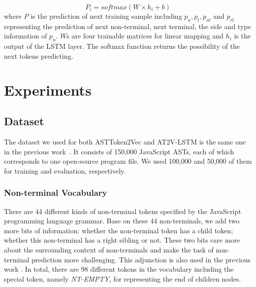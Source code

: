 \documentclass[E]{compsoft}
\begin{document}
\begin{equation}
P_{i} = \mathit{softmax}(W \times h_{i} + b)
\end{equation}
where $P$ is the prediction of next training sample including $p_{n}, p_{t}, p_{nl}$ and $p_{rl}$ representing the prediction of next non-terminal, next terminal, the side and type information of $p_{n}$. 
$W$s are four trainable matrices for linear mapping and $h_{i}$ is the output of the LSTM layer.
The softmax function returns the possibility of the next tokens predicting.
 




\section{Experiments}
\label{section:experiment}
\subsection{Dataset}
The dataset we used for both ASTToken2Vec and AT2V-LSTM  is the same one in the previous work~\cite{dataset}.  It consists of 150,000 JavaScript ASTs, each of which corresponds to one open-source program file.   We used 100,000 and 50,000 of them for training and evaluation, respectively.

\subsubsection{Non-terminal Vocabulary} 
There are 44 different kinds of non-terminal tokens specified by the JavaScript programming language grammar. 
Base on these 44 non-terminals, we add two more bits of information: whether the non-terminal token has a child token; whether this non-terminal has a right sibling or not. 
These two bits care more about the surrounding context of non-terminals and make the task of non-terminal prediction more challenging. 
This adjunction is also used in the previous work \cite{liu2016neural,dataset}. 
In total, there are 98 different tokens in the vocabulary including the special token, namely \textit{NT-EMPTY}, for representing the end of children nodes.%
\end{document}
